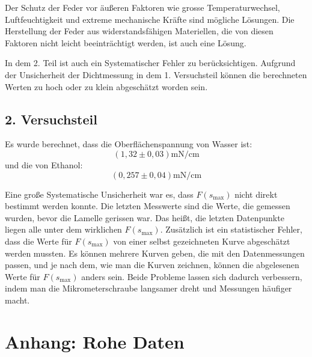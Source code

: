 \documentclass[11pt,a4paper]{article} %
\begin{document}
Der Schutz der Feder vor äußeren Faktoren wie grosse 
Temperaturwechsel, Luftfeuchtigkeit und extreme mechanische Kräfte sind mögliche Lösungen. Die Herstellung der Feder aus widerstandsfähigen Materiellen, die von diesen Faktoren nicht leicht beeinträchtigt werden, ist auch eine Lösung. 

In dem 2. Teil ist auch ein Systematischer Fehler zu berücksichtigen. Aufgrund der Unsicherheit der Dichtmessung in dem 1. Versuchsteil können die berechneten Werten zu hoch oder zu klein abgeschätzt worden sein.

\subsection{2. Versuchsteil}
Es wurde berechnet, dass die Oberflächenspannung von Wasser ist:
$$(1,32\pm 0,03) \textrm{mN/cm}$$
und die von Ethanol:
$$(0,257 \pm 0,04) \textrm{mN/cm}$$

Eine große Systematische Unsicherheit war es, dass  $F(s_\textrm{max})$ nicht direkt bestimmt werden konnte. Die letzten Messwerte sind die Werte, die gemessen wurden, bevor die Lamelle gerissen war. Das heißt, die letzten Datenpunkte liegen alle unter dem wirklichen $F(s_\text{max})$. Zusätzlich ist ein statistischer Fehler, dass die Werte für $F(s_\textrm{max})$ von einer selbst gezeichneten Kurve abgeschätzt werden mussten. Es können mehrere Kurven geben, die mit den Datenmessungen passen, und je nach dem, wie man die Kurven zeichnen, können die abgelesenen Werte für $F(s_\textrm{max})$ anders sein. Beide Probleme lassen sich dadurch verbessern, indem man die Mikrometerschraube langsamer dreht und Messungen häufiger macht. 

\newpage
\section{Anhang: Rohe Daten}
\end{document}

